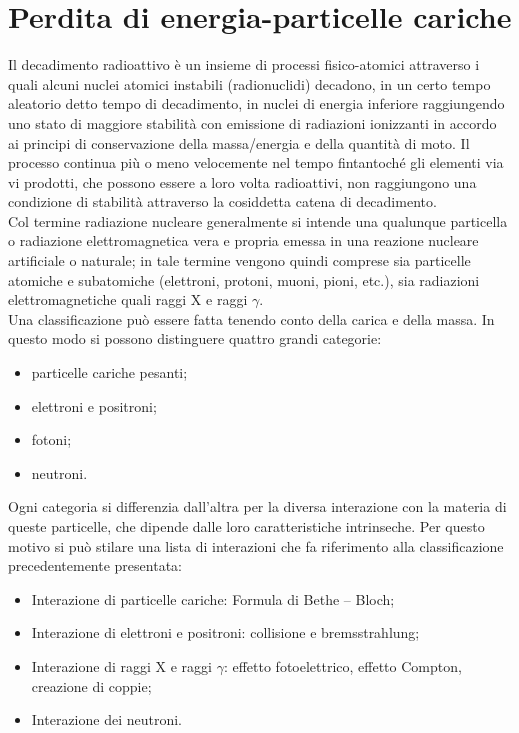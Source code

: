 \documentclass[12pt, letterpaper]{book}
\begin{document}
\chapter{Perdita di energia-particelle cariche}
Il decadimento radioattivo è un insieme di processi fisico-atomici attraverso i quali alcuni nuclei atomici instabili (radionuclidi) decadono, in un certo tempo aleatorio detto tempo di decadimento, in nuclei di energia inferiore raggiungendo uno stato di maggiore stabilità con emissione di radiazioni ionizzanti in accordo ai principi di conservazione della massa/energia e della quantità di
moto. Il processo continua più o meno velocemente nel tempo fintantoché gli elementi via vi prodotti, che possono essere a loro volta radioattivi, non raggiungono una condizione di stabilità attraverso la cosiddetta catena di decadimento.\\
Col termine radiazione nucleare generalmente si intende una qualunque particella o radiazione elettromagnetica vera e propria emessa in una reazione nucleare artificiale o naturale; in tale termine vengono quindi comprese sia particelle atomiche e subatomiche (elettroni, protoni, muoni,
pioni, etc.), sia radiazioni elettromagnetiche quali raggi X e raggi $\gamma$.\\ 
Una classificazione può essere fatta tenendo conto della carica e della massa. In questo modo si possono distinguere quattro grandi
categorie:
\begin{itemize}
    \item[1)] particelle cariche pesanti;
    \item[2)] elettroni e positroni;
    \item[3)] fotoni;
    \item[4)] neutroni.
\end{itemize}
Ogni categoria si differenzia dall'altra per la diversa interazione con la materia di queste particelle, che dipende dalle loro caratteristiche intrinseche.
Per questo motivo si può stilare una lista di interazioni che fa riferimento alla classificazione precedentemente presentata:
\begin{itemize}
    \item[1)] Interazione di particelle cariche: Formula di Bethe – Bloch;
    \item[2)] Interazione di elettroni e positroni: collisione e bremsstrahlung;
    \item[3)] Interazione di raggi X e raggi $\gamma$: effetto fotoelettrico, effetto Compton, creazione di coppie;
    \item[4)] Interazione dei neutroni.
\end{itemize}
\end{document}
